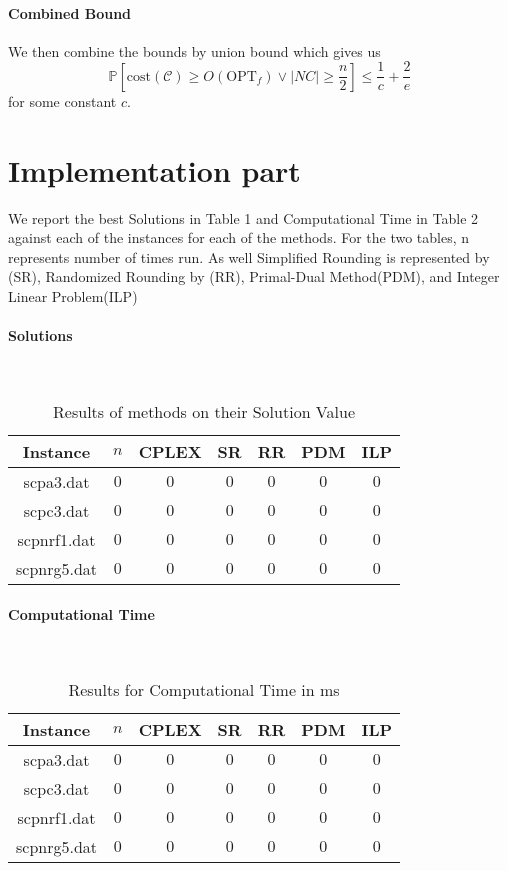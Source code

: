 \documentclass[11pt,a4paper,english]{article}
\newcommand{\PP}{\mathbb{P}}      %
\begin{document}
\paragraph{Combined Bound}
We then combine the bounds by union bound which gives us
$$\PP\left[\mathrm{cost}(\mathcal{C}) \geq O(\mathrm{OPT}_f) \vee  |NC| \geq \frac{n}{2} \right]
\leq \frac{1}{c} + \frac{2}{e}$$
for some constant $c$.

\clearpage


\section{Implementation part}

We report the best Solutions in Table 1 and Computational Time in Table 2 against each of the instances for each of the methods. For the two tables, n represents number of times run. As well Simplified Rounding is represented by (SR), Randomized Rounding by (RR), Primal-Dual Method(PDM), and Integer Linear Problem(ILP)

\paragraph{Solutions}\mbox{}\\


\begin{table}[h!]
  \centering
  \begin{tabular}{|c|c|c|c|c|c|c|}\hline
    Instance& $n$& CPLEX&SR&RR&PDM&ILP  \\\hline
    scpa3.dat &$0$&$0$ & $0$ & $0$& $0$ & $0$  \\
    scpc3.dat &$0$&$0$ & $0$ & $0$& $0$ & $0$ \\
    scpnrf1.dat &$0$&$0$ & $0$ & $0$& $0$ & $0$  \\
    scpnrg5.dat &$0$&$0$ & $0$ & $0$& $0$ & $0$  \\\hline
  \end{tabular}
  \caption{Results of methods on their Solution Value}
  \label{tab:res}
\end{table}

\paragraph{Computational Time}\mbox{}\\

\begin{table}[h!]
  \centering
  \begin{tabular}{|c|c|c|c|c|c|c|}\hline
    Instance& $n$& CPLEX&SR&RR&PDM&ILP \\\hline
    scpa3.dat &$0$&$0$ & $0$ & $0$& $0$ & $0$  \\
    scpc3.dat &$0$&$0$ & $0$ & $0$& $0$ & $0$ \\
    scpnrf1.dat	 &$0$&$0$ & $0$ & $0$& $0$ & $0$  \\
    scpnrg5.dat &$0$&$0$ & $0$ & $0$& $0$ & $0$  \\\hline
  \end{tabular}
  \caption{Results for Computational Time in ms}
  \label{tab:res}
\end{table}
\end{document}
